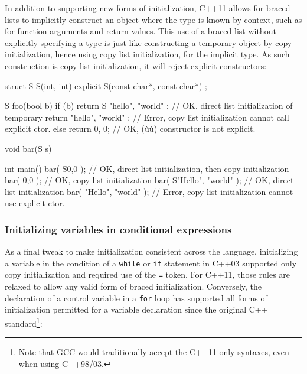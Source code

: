 In addition to supporting new forms of initialization, C++11 allows for
braced lists to implicitly construct an object where the type is known
by context, such as for function arguments and return values. This use
of a braced list without explicitly specifying a type is just like
constructing a temporary object by copy initialization, hence using copy
list initialization, for the implicit type. As such construction is copy
list initialization, it will reject explicit constructors:

\begin{emcppslisting}
struct S
{
    S(int, int) {}
    explicit S(const char*, const char*) {}
};

S foo(bool b)
{
    if (b)
    {
        return S{ "hello", "world" };  // OK, direct list initialization of temporary
        return { "hello", "world" };   // Error, copy list initialization cannot call explicit ctor.
    }
    else
    {
        return {0, 0};  // OK, (ù{}ù) constructor is not explicit.
    }
}

void bar(S s) { }

int main()
{
   bar( S{0,0} );  // OK, direct list initialization, then copy initialization
   bar(  {0,0} );  // OK, copy list initialization
   bar( S{"Hello", "world"} );  // OK, direct list initialization
   bar(  {"Hello", "world"} );  // Error, copy list initialization cannot use explicit ctor.
}
\end{emcppslisting}
    

\subsubsection[Initializing variables in conditional expressions]{Initializing variables in conditional expressions}\label{initializing-variables-in-conditional-expressions}

As a final tweak to make initialization consistent across the language,
initializing a variable in the condition of a \lstinline!while! or
\lstinline!if! statement in C++03 supported only copy initialization and
required use of the \lstinline!=! token. For C++11, those rules are relaxed
to allow any valid form of braced initialization. Conversely, the
declaration of a control variable in a \lstinline!for! loop has supported
all forms of initialization permitted for a variable declaration since
the original C++ standard{\cprotect\footnote{Note that GCC would
traditionally accept the C++11-only syntaxes, even when using
  C++98/03.}}:

